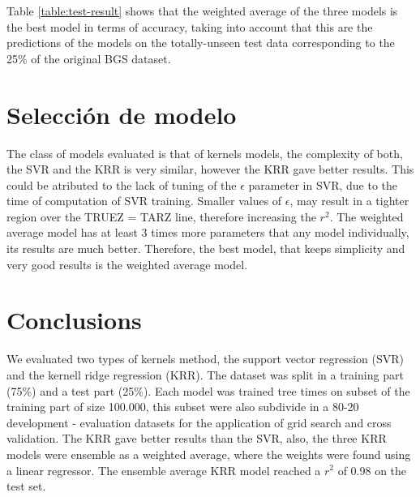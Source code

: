 Table \ref{table:test-result} shows that the weighted average of the three models is the best model in terms of accuracy, taking into account that this are the predictions of the models on the totally-unseen test data corresponding to the 25\% of the original BGS dataset. 
\section{Selección de modelo}

The class of models evaluated is that of kernels models, the complexity of both, the SVR and the KRR is very similar, however the KRR gave better results. This could be atributed to the lack of tuning of the $\epsilon$ parameter in SVR, due to the time of computation of SVR training. Smaller values of $\epsilon$, may result in a tighter region over the TRUEZ = TARZ line, therefore increasing the $r^2$. The weighted average model has at least 3 times more parameters that any model individually, its results are much better. Therefore, the best model, that keeps simplicity and very good results is the weighted average model. 

\section{Conclusions}

We evaluated two types of kernels method, the support vector regression (SVR) and the kernell ridge regression (KRR). The dataset was split in a training part (75\%) and a test part (25\%). Each model was trained tree times on subset of the training part of size 100.000, this subset were also subdivide in a 80-20 development - evaluation datasets for the application of grid search and cross validation. The KRR gave better results than the SVR, also, the three KRR models were ensemble as a weighted average, where the weights were found using a linear regressor. The ensemble average KRR model reached a $r^2$ of 0.98 on the test set. 